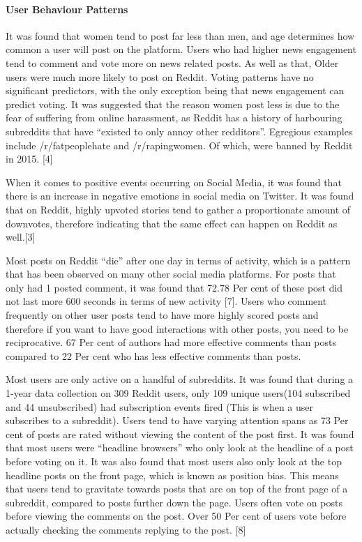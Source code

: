 \paragraph{User Behaviour Patterns}
It was found that women tend to post far less than men, and age determines how common a user will post on the platform. Users who had higher news engagement tend to comment and vote more on news related posts. As well as that, Older users were much more likely to post on Reddit.  Voting patterns have no significant predictors, with the only exception being that news engagement can predict voting. It was suggested that the reason women post less is due to the fear of suffering from online harassment, as Reddit has a history of harbouring subreddits that have “existed to only annoy other redditors”. Egregious examples include /r/fatpeoplehate and /r/rapingwomen. Of which, were banned by Reddit in 2015. [4]

When it comes to positive events occurring on Social Media, it was found that there is an increase in negative emotions in social media on Twitter. It was found that on Reddit, highly upvoted stories tend to gather a proportionate amount of downvotes, therefore indicating that the same effect can happen on Reddit as well.[3]

Most posts on Reddit “die” after one day in terms of activity, which is a pattern that has been observed on many other social media platforms. For posts that only had 1 posted comment, it was found that 72.78 Per cent of these post did not last more  600 seconds in terms of new activity [7]. Users who comment frequently on other user posts tend to have more highly scored posts and therefore if you want to have good interactions with other posts, you need to be reciprocative. 67 Per cent of authors had more effective comments than posts compared to 22 Per cent who has less effective comments than posts.

Most users are only active on a handful of subreddits. It was found that during a 1-year data collection on 309 Reddit users, only 109 unique users(104 subscribed and 44 unsubscribed) had subscription events fired (This is when a user subscribes to a subreddit). Users tend to have varying attention spans as 73 Per cent of posts are rated without viewing the content of the post first. It was found that most users were “headline browsers” who only look at the headline of a post before voting on it. It was also found that most users also only look at the top headline posts on the front page, which is known as position bias. This means that users tend to gravitate towards posts that are on top of the front page of a subreddit, compared to posts further down the page. Users often vote on posts before viewing the comments on the post. Over 50 Per cent of users vote before actually checking the comments replying to the post. [8]

